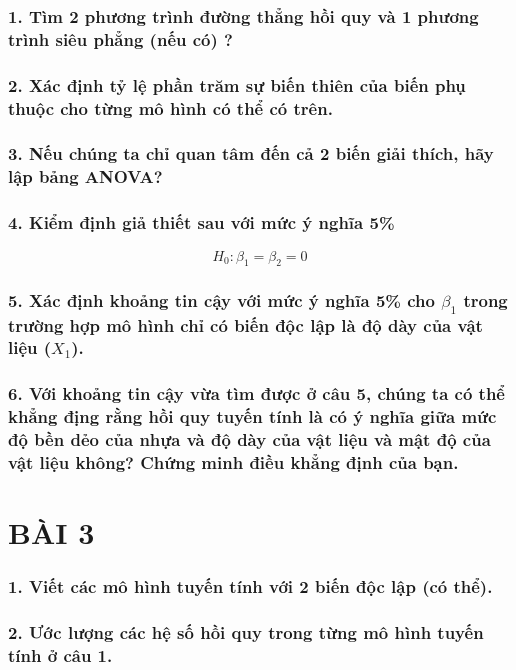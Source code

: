 \documentclass[a4paper]{article}
\theoremstyle{nonumberplain}
\begin{document}
\subsubsection*{1. Tìm 2 phương trình đường thẳng hồi quy và 1 phương trình siêu phẳng (nếu có) ?}

\subsubsection*{2. Xác định tỷ lệ phần trăm sự biến thiên của biến phụ thuộc cho từng mô hình có thể có trên.}


\subsubsection*{3. Nếu chúng ta chỉ quan tâm đến cả 2 biến giải thích, hãy lập bảng ANOVA?}

\subsubsection*{4. Kiểm định giả thiết sau với mức ý nghĩa 5\%}
$$H_0 : \beta_1 = \beta_2= 0 $$

\subsubsection*{5. Xác định khoảng tin cậy với mức ý nghĩa 5\% cho $\beta_1$ trong trường hợp mô hình chỉ có biến độc lập là độ dày của vật liệu ($X_1$).}


\subsubsection*{6. Với khoảng tin cậy vừa tìm được ở câu 5, chúng ta có thể khẳng địng rằng hồi quy tuyến tính là có ý nghĩa giữa mức độ bền dẻo của nhựa và độ dày của vật liệu và mật độ của vật liệu không? Chứng minh điều khẳng định của bạn.}


\newpage
\section*{BÀI 3}


\subsubsection*{1. Viết các mô hình tuyến tính với 2 biến độc lập (có thể).}


\subsubsection*{2. Ước lượng các hệ số hồi quy trong từng mô hình tuyến tính ở câu 1.}
\end{document}
